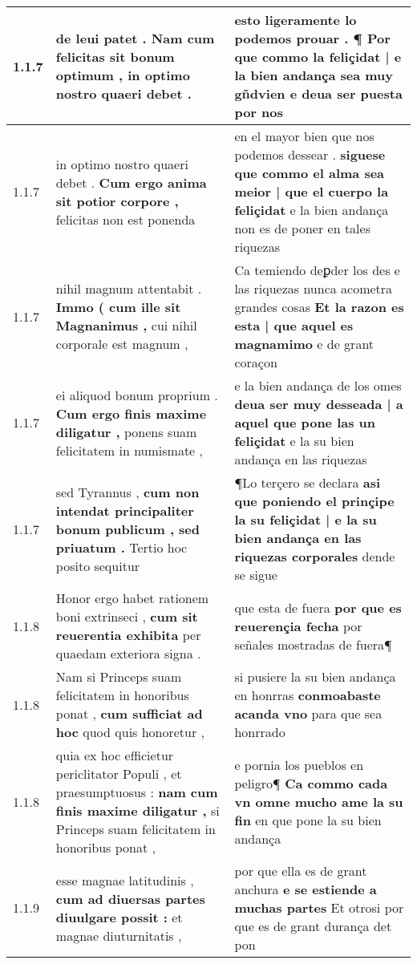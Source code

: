 \begin{tabular}{|p{1cm}|p{6.5cm}|p{6.5cm}|}
1.1.7 & de leui patet . \textbf{ Nam cum felicitas sit bonum optimum , } in optimo nostro quaeri debet . & esto ligeramente lo podemos prouar . \textbf{ ¶ Por que commo la feliçidat | e la bien andança sea muy gñdvien } e deua ser puesta por nos \\\hline
1.1.7 & in optimo nostro quaeri debet . \textbf{ Cum ergo anima sit potior corpore , } felicitas non est ponenda & en el mayor bien que nos podemos dessear . \textbf{ siguese que commo el alma sea meior | que el cuerpo la feliçidat } e la bien andança non es de poner en tales riquezas \\\hline
1.1.7 & nihil magnum attentabit . \textbf{ Immo ( cum ille sit Magnanimus , } cui nihil corporale est magnum , & Ca temiendo deꝑder los des e las riquezas nunca acometra grandes cosas \textbf{ Et la razon es esta | que aquel es magnamimo } e de grant coraçon \\\hline
1.1.7 & ei aliquod bonum proprium . \textbf{ Cum ergo finis maxime diligatur , } ponens suam felicitatem in numismate , & e la bien andança de los omes \textbf{ deua ser muy desseada | a aquel que pone las un feliçidat } e la su bien andança en las riquezas \\\hline
1.1.7 & sed Tyrannus , \textbf{ cum non intendat principaliter bonum publicum , sed priuatum . } Tertio hoc posito sequitur & ¶Lo terçero se declara \textbf{ asi que poniendo el prinçipe la su feliçidat | e la su bien andança en las riquezas corporales } dende se sigue \\\hline
1.1.8 & Honor ergo habet rationem boni extrinseci , \textbf{ cum sit reuerentia exhibita } per quaedam exteriora signa . & que esta de fuera \textbf{ por que es reuerençia fecha } por señales mostradas de fuera¶ \\\hline
1.1.8 & Nam si Princeps suam felicitatem in honoribus ponat , \textbf{ cum sufficiat ad hoc } quod quis honoretur , & si pusiere la su bien andança en honrras \textbf{ conmoabaste acanda vno } para que sea honrrado \\\hline
1.1.8 & quia ex hoc efficietur periclitator Populi , et praesumptuosus : \textbf{ nam cum finis maxime diligatur , } si Princeps suam felicitatem in honoribus ponat , & e pornia los pueblos en peligro¶ \textbf{ Ca commo cada vn omne mucho ame la su fin } en que pone la su bien andança \\\hline
1.1.9 & esse magnae latitudinis , \textbf{ cum ad diuersas partes diuulgare possit : } et magnae diuturnitatis , & por que ella es de grant anchura \textbf{ e se estiende a muchas partes } Et otrosi por que es de grant durança det pon \\\hline

\end{tabular}
